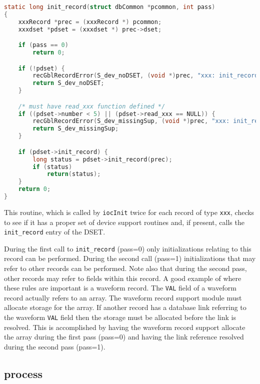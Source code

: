 \begin{lstlisting}[language=C]
static long init_record(struct dbCommon *pcommon, int pass)
{
    xxxRecord *prec = (xxxRecord *) pcommon;
    xxxdset *pdset = (xxxdset *) prec->dset;

    if (pass == 0)
        return 0;

    if (!pdset) {
        recGblRecordError(S_dev_noDSET, (void *)prec, "xxx: init_record");
        return S_dev_noDSET;
    }

    /* must have read_xxx function defined */
    if ((pdset->number < 5) || (pdset->read_xxx == NULL)) {
        recGblRecordError(S_dev_missingSup, (void *)prec, "xxx: init_record");
        return S_dev_missingSup;
    }

    if (pdset->init_record) {
        long status = pdset->init_record(prec);
        if (status)
            return(status);
    }
    return 0;
}
\end{lstlisting}

This routine, which is called by \verb|iocInit| twice for each record of type \verb|xxx|, checks to see if it has a proper set of device support routines and, if present, calls the \verb|init_record| entry of the DSET.

During the first call to \verb|init_record| (pass=0) only initializations relating to this record can be performed.
During the second call (pass=1) initializations that may refer to other records can be performed.
Note also that during the second pass, other records may refer to fields within this record.
A good example of where these rules are important is a waveform record.
The \verb|VAL| field of a waveform record actually refers to an array.
The waveform record support module must allocate storage for the array.
If another record has a database link referring to the waveform \verb|VAL| field then the storage must be allocated before the link is resolved.
This is accomplished by having the waveform record support allocate the array during the first pass (pass=0) and having the link reference resolved during the second pass (pass=1).

\subsection{process}

